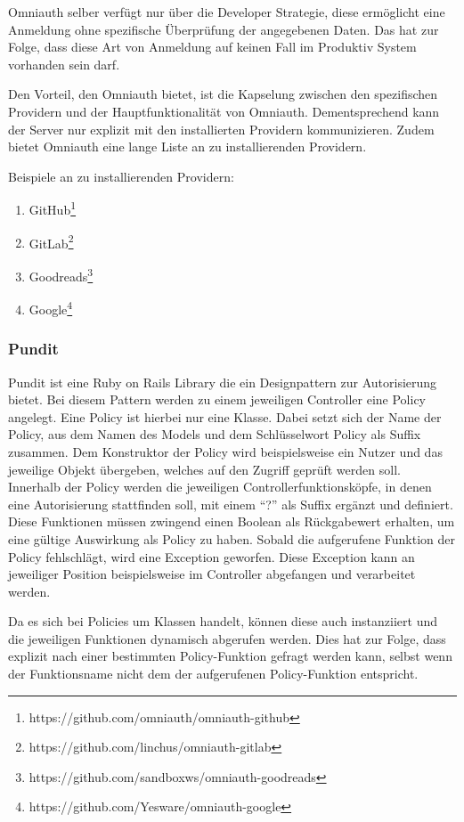 Omniauth selber verfügt nur über die Developer Strategie, diese ermöglicht eine Anmeldung ohne spezifische Überprüfung der angegebenen Daten. Das hat zur Folge, dass diese Art von Anmeldung auf keinen Fall im Produktiv System vorhanden sein darf.

Den Vorteil, den Omniauth bietet, ist die Kapselung zwischen den spezifischen Providern und der Hauptfunktionalität von Omniauth. Dementsprechend kann der Server nur explizit mit den installierten Providern kommunizieren. Zudem bietet Omniauth eine lange Liste an zu installierenden Providern.

Beispiele an zu installierenden Providern: 
\begin{enumerate} 
	\item GitHub\footnote{https://github.com/omniauth/omniauth-github}
	\item GitLab\footnote{https://github.com/linchus/omniauth-gitlab}
	\item Goodreads\footnote{https://github.com/sandboxws/omniauth-goodreads}
	\item Google\footnote{https://github.com/Yesware/omniauth-google}
\end{enumerate}

\subsubsection{Pundit}
\label{sec: pundit}
Pundit ist eine Ruby on Rails Library die ein Designpattern zur Autorisierung bietet. Bei diesem Pattern werden zu einem jeweiligen Controller eine Policy angelegt. Eine Policy ist hierbei nur eine Klasse. Dabei setzt sich der Name der Policy, aus dem Namen des Models und dem Schlüsselwort Policy als Suffix zusammen. Dem Konstruktor der Policy wird beispielsweise ein Nutzer und das jeweilige Objekt übergeben, welches auf den Zugriff geprüft werden soll. Innerhalb der Policy werden die jeweiligen Controllerfunktionsköpfe, in denen eine Autorisierung stattfinden soll, mit einem \enquote{?} als Suffix ergänzt und definiert. Diese Funktionen müssen zwingend einen Boolean als Rückgabewert erhalten, um eine gültige Auswirkung als Policy zu haben. Sobald die aufgerufene Funktion der Policy fehlschlägt, wird eine Exception geworfen. Diese Exception kann an jeweiliger Position beispielsweise im Controller abgefangen und verarbeitet werden.

Da es sich bei Policies um Klassen handelt, können diese auch instanziiert und die jeweiligen Funktionen dynamisch abgerufen werden. Dies hat zur Folge, dass explizit nach einer bestimmten Policy-Funktion gefragt werden kann, selbst wenn der Funktionsname nicht dem der aufgerufenen Policy-Funktion entspricht.

